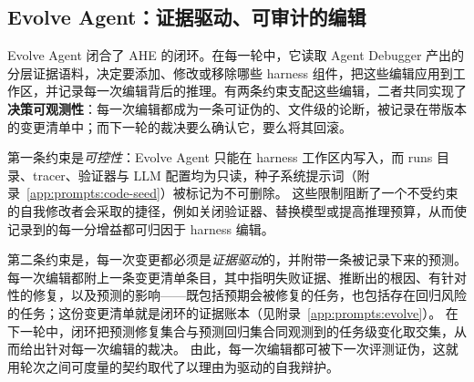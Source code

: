 \subsection{Evolve Agent：证据驱动、可审计的编辑}
\label{sec:method:evolve}

Evolve Agent 闭合了 AHE 的闭环。在每一轮中，它读取 Agent Debugger 产出的分层证据语料，决定要添加、修改或移除哪些 harness 组件，把这些编辑应用到工作区，并记录每一次编辑背后的推理。有两条约束支配这些编辑，二者共同实现了\textbf{决策可观测性}：每一次编辑都成为一条可证伪的、文件级的论断，被记录在带版本的变更清单中；而下一轮的裁决要么确认它，要么将其回滚。

第一条约束是\textit{可控性}：Evolve Agent 只能在 harness 工作区内写入，而 runs 目录、tracer、验证器与 LLM 配置均为只读，种子系统提示词（附录~\ref{app:prompts:code-seed}）被标记为不可删除。
这些限制阻断了一个不受约束的自我修改者会采取的捷径，例如关闭验证器、替换模型或提高推理预算，从而使记录到的每一分增益都可归因于 harness 编辑。

第二条约束是，每一次变更都必须是\textit{证据驱动}的，并附带一条被记录下来的预测。
每一次编辑都附上一条变更清单条目，其中指明失败证据、推断出的根因、有针对性的修复，以及预测的影响——既包括预期会被修复的任务，也包括存在回归风险的任务；这份变更清单就是闭环的证据账本（见附录~\ref{app:prompts:evolve}）。
在下一轮中，闭环把预测修复集合与预测回归集合同观测到的任务级变化取交集，从而给出针对每一次编辑的裁决。
由此，每一次编辑都可被下一次评测证伪，这就用轮次之间可度量的契约取代了以理由为驱动的自我辩护。




